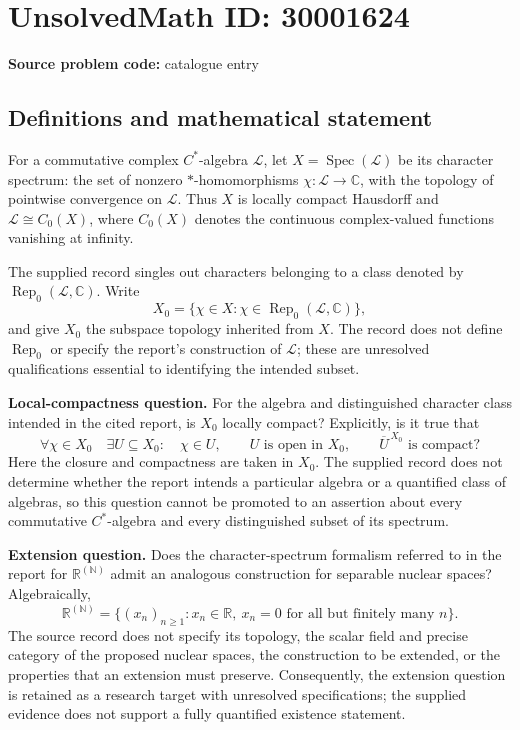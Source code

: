 \documentclass[11pt]{article}
\newcommand{\N}{\mathbb{N}}
\newcommand{\R}{\mathbb{R}}
\newcommand{\C}{\mathbb{C}}
\begin{document}
\section*{UnsolvedMath ID: 30001624}
\textbf{Source problem code:} catalogue entry
\subsection{Definitions and mathematical statement}
For a commutative complex \(C^*\)-algebra \(\mathcal L\), let \(X=\operatorname{Spec}(\mathcal L)\) be its character spectrum: the set of nonzero \(*\)-homomorphisms \(\chi:\mathcal L\to\C\), with the topology of pointwise convergence on \(\mathcal L\). Thus \(X\) is locally compact Hausdorff and \(\mathcal L\cong C_0(X)\), where \(C_0(X)\) denotes the continuous complex-valued functions vanishing at infinity.

The supplied record singles out characters belonging to a class denoted by \(\operatorname{Rep}_0(\mathcal L,\C)\). Write
\[
X_0=\{\chi\in X:\chi\in\operatorname{Rep}_0(\mathcal L,\C)\},
\]
and give \(X_0\) the subspace topology inherited from \(X\). The record does not define \(\operatorname{Rep}_0\) or specify the report's construction of \(\mathcal L\); these are unresolved qualifications essential to identifying the intended subset.

\textbf{Local-compactness question.} For the algebra and distinguished character class intended in the cited report, is \(X_0\) locally compact? Explicitly, is it true that
\[
\forall\chi\in X_0\quad\exists U\subseteq X_0:\quad
\chi\in U,\qquad U\text{ is open in }X_0,\qquad
\overline U^{\,X_0}\text{ is compact}?
\]
Here the closure and compactness are taken in \(X_0\). The supplied record does not determine whether the report intends a particular algebra or a quantified class of algebras, so this question cannot be promoted to an assertion about every commutative \(C^*\)-algebra and every distinguished subset of its spectrum.

\textbf{Extension question.} Does the character-spectrum formalism referred to in the report for \(\R^{(\N)}\) admit an analogous construction for separable nuclear spaces? Algebraically,
\[
\R^{(\N)}=\{(x_n)_{n\geq1}:x_n\in\R,\ x_n=0\text{ for all but finitely many }n\}.
\]
The source record does not specify its topology, the scalar field and precise category of the proposed nuclear spaces, the construction to be extended, or the properties that an extension must preserve. Consequently, the extension question is retained as a research target with unresolved specifications; the supplied evidence does not support a fully quantified existence statement.
\end{document}
